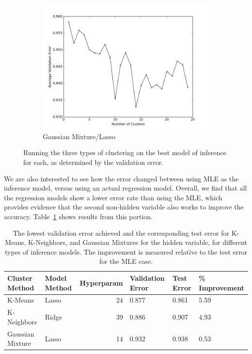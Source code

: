 \documentclass[11pt]{article}
\begin{document}
\begin{figure}[h!]
\begin{subfigure}[h!]{0.33\textwidth}
        \includegraphics[width=\textwidth]{GM_lasso.png}
        \caption{Gaussian Mixture/Lasso}
        \label{fig:gmBEST}
    \end{subfigure}
    \caption{Running the three types of clustering on the best model of inference for each, as determined by the validation error.}
    \label{fig:BEST}
\end{figure}

We are also interested to see how the error changed between using MLE as the inference model, versus using an actual regression model. Overall, we find that all the regression models show a lower error rate than using the MLE, which provides evidence that the second non-hidden variable also works to improve the accuracy. Table~\ref{tab:improvement} shows results from this portion.

\begin{table}[h!]
    \begin{tabularx}{1.0\textwidth}{| l | X | r | X | X | X |}
        \hline
        Cluster Method & Model Method & Hyperparam & Validation Error & Test Error & \% \mbox{Improvement}\\
        \hline
        K-Means & Lasso & 24 & 0.877 & 0.861 & 5.59 \\
        K-Neighbors & Ridge & 39 & 0.886 & 0.907 & 4.93 \\
        Gaussian Mixture & Lasso & 14 & 0.932 & 0.938 & 0.53 \\
        \hline
    \end{tabularx}
    \caption{The lowest validation error achieved and the corresponding test error for K-Means, K-Neighbors, and Gaussian Mixtures for the hidden variable, for different types of inference models. The improvement is measured relative to the test error for the MLE case.}
    \label{tab:improvement}
\end{table}
\end{document}
